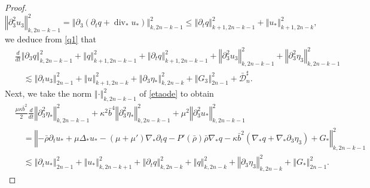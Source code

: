 \documentclass[a4paper,reqno,11pt]{amsart}
\numberwithin{equation}{section}
\providecommand{\norm}[1]{\left\Vert#1\right\Vert}
\providecommand{\norm}[1]{\left\Vert#1\right\Vert}
\begin{document}
\begin{proof}
\begin{equation}
 \norm{{\partial}_3^2 u_3  }_{k,2n-k-1}^2 = \norm{{\partial}_3 ({\partial_t} q+ \operatorname{div}_\ast u_\ast ) }_{k,2n-k-1}^2 \le\norm{ {\partial_t} q}_{k+1,2n-k-1}^2 + \norm{  u_\ast }_{k+1,2n-k}^2,
\end{equation}
we deduce from \eqref{q1} that
\begin{equation}\label{q2}
\begin{split}
&  { \frac{d}{dt}}  \norm{ {\partial}_3    {q} }_{k,2n-k-1}^2  +  \norm{q}_{k+1,2n-k-1}^2
 +  \norm{  {\partial_t}  {q} }_{k+1,2n-k-1}^2+ \norm{{\partial}_3^2 u_3  }_{k,2n-k-1}^2+ \norm{{\partial}_3^2 \eta_3  }_{k,2n-k-1}^2
\\&\quad{\lesssim}   \norm{{\partial}_t  u_3 }_{2n-1}^2
+  \norm{    u }_{k+1,2n-k}^2+ \norm{{\partial}_3   \eta_\ast }_{k,2n-k}^2+\norm{G_3}_{2n-1}^2 +\bar{\mathcal{D}}_n^\sharp.
\end{split}
\end{equation}
Next, we take the norm $\norm{\cdot}_{k,2n-k-1}^2$ of \eqref{etaode} to obtain
\begin{equation}\label{q3}
\begin{split}
&\frac{\mu\kappa\bar b^2}{2}\frac{d}{dt}   \norm{  {\partial}_3^2   \eta_\ast }_{k,2n-k-1}^2  + \kappa^2\bar b^4 \norm{  {\partial}_3^2   \eta_\ast }_{k,2n-k-1}^2
 + \mu^2\norm{ {\partial}_3^2  u_\ast }_{k,2n-k-1}^2
  \\&\quad=\norm{-\bar \rho\partial_t u_\ast +\mu\Delta_\ast u_\ast  -(\mu+\mu')\nabla_\ast {\partial_t} q - P '(\bar{\rho} )\bar\rho \nabla_\ast q-\kappa\bar b^2\left( \nabla_\ast q+ \nabla_\ast {\partial}_3\eta_3\right)+G_\ast}_{k,2n-k-1}^2
\\
&\quad{\lesssim}  \norm{{\partial}_t  u_\ast  }_{2n-1}^2
+  \norm{   u_\ast }_{k,2n-k+1}^2+\norm{ {\partial_t} q }_{k,2n-k}^2+\norm{  q }_{k,2n-k}^2+\norm{   {\partial}_3\eta_3 }_{k,2n-k}^2 +\norm{G_\ast}_{2n-1}^2.
\end{split}
\end{equation}


\end{proof}
\end{document}
